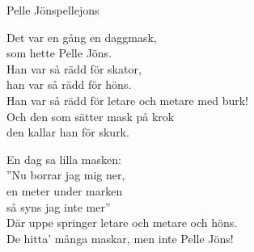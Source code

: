\begin{song}{Pelle Jöns}{pellejons}
\begin{vers}
Det var en gång en daggmask,\\
som hette Pelle Jöns.\\
Han var så rädd för skator,\\
han var så rädd för höns.\\
Han var så rädd för letare och metare med burk!\\
Och den som sätter mask på krok\\
den kallar han för skurk.\\
\end{vers}
\begin{vers}
En dag sa lilla masken:\\
''Nu borrar jag mig ner,\\
en meter under marken\\
så syns jag inte mer''\\
Där uppe springer letare och metare och höns.\\
De hitta' många maskar, men inte Pelle Jöns!\\
\end{vers}
\end{song}
